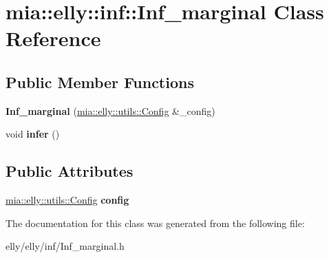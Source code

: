 \hypertarget{classmia_1_1elly_1_1inf_1_1_inf__marginal}{\section{mia\-:\-:elly\-:\-:inf\-:\-:Inf\-\_\-marginal Class Reference}
\label{classmia_1_1elly_1_1inf_1_1_inf__marginal}
}
\subsection*{Public Member Functions}
\begin{DoxyCompactItemize}
\item 
\hypertarget{classmia_1_1elly_1_1inf_1_1_inf__marginal_a010c28071c9fd56f4fa252a7c8e70461}{{\bfseries Inf\-\_\-marginal} (\hyperlink{classmia_1_1elly_1_1utils_1_1_config}{mia\-::elly\-::utils\-::\-Config} \&\-\_\-config)}\label{classmia_1_1elly_1_1inf_1_1_inf__marginal_a010c28071c9fd56f4fa252a7c8e70461}

\item 
\hypertarget{classmia_1_1elly_1_1inf_1_1_inf__marginal_ae2189535bde062578059e50c5d79be2f}{void {\bfseries infer} ()}\label{classmia_1_1elly_1_1inf_1_1_inf__marginal_ae2189535bde062578059e50c5d79be2f}

\end{DoxyCompactItemize}
\subsection*{Public Attributes}
\begin{DoxyCompactItemize}
\item 
\hypertarget{classmia_1_1elly_1_1inf_1_1_inf__marginal_a8bb87e22575b34298b052f9cbd0edbeb}{\hyperlink{classmia_1_1elly_1_1utils_1_1_config}{mia\-::elly\-::utils\-::\-Config} {\bfseries config}}\label{classmia_1_1elly_1_1inf_1_1_inf__marginal_a8bb87e22575b34298b052f9cbd0edbeb}

\end{DoxyCompactItemize}


The documentation for this class was generated from the following file\-:\begin{DoxyCompactItemize}
\item 
elly/elly/inf/Inf\-\_\-marginal.\-h\end{DoxyCompactItemize}
